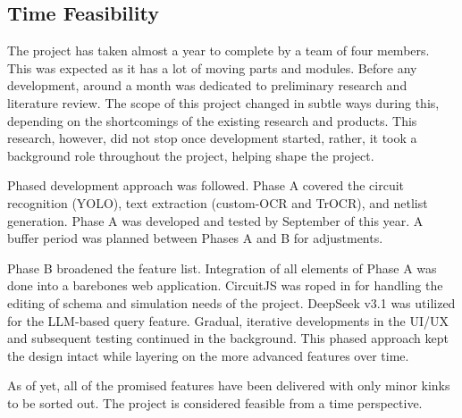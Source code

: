 \subsection{Time Feasibility}

The project has taken almost a year to complete by a team of four members. This was expected as it has a lot of moving parts and modules. Before any development, around a month was dedicated to preliminary research and literature review. The scope of this project changed in subtle ways during this, depending on the shortcomings of the existing research and products. This research, however, did not stop once development started, rather, it took a background role throughout the project, helping shape the project.

Phased development approach was followed. Phase A covered the circuit recognition (YOLO), text extraction (custom-OCR and TrOCR), and netlist generation. Phase A was developed and tested by September of this year. A buffer period was planned between Phases A and B for adjustments.

Phase B broadened the feature list. Integration of all elements of Phase A was done into a barebones web application. CircuitJS was roped in for handling the editing of schema and simulation needs of the project. DeepSeek v3.1 was utilized for the LLM-based query feature. Gradual, iterative developments in the UI/UX and subsequent testing continued in the background. This phased approach kept the design intact while layering on the more advanced features over time.

As of yet, all of the promised features have been delivered with only minor kinks to be sorted out. The project is considered feasible from a time perspective.

